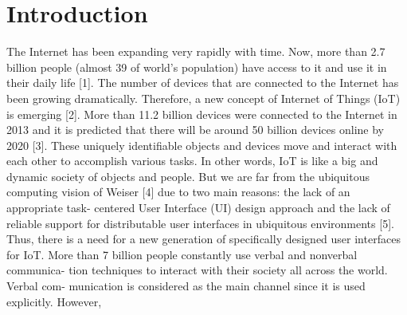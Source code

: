 \documentclass[runningheads,a4paper]{llncs}
\begin{document}
\section{Introduction}

The Internet has been expanding very rapidly with time. Now, more than 2.7 billion people (almost 39 of world’s population) have access to it and use it in their daily life [1]. The number of devices that are connected to the Internet has been growing dramatically. Therefore, a new concept of Internet of Things (IoT) is emerging [2]. More than 11.2 billion devices were connected to the Internet in 2013 and it is predicted that there will be around 50 billion devices online by 2020 [3]. These uniquely identifiable objects and devices move and interact with each other to accomplish various tasks. In other words, IoT is like a big and dynamic society of objects and people. But we are far from the ubiquitous computing vision of Weiser [4] due to two main reasons: the lack of an appropriate task- centered User Interface (UI) design approach and the lack of reliable support for distributable user interfaces in ubiquitous environments [5]. Thus, there is a need for a new generation of specifically designed user interfaces for IoT.
\newline
More than 7 billion people constantly use verbal and nonverbal communica- tion techniques to interact with their society all across the world. Verbal com- munication is considered as the main channel since it is used explicitly. However, 
\newpage
\end{document}
